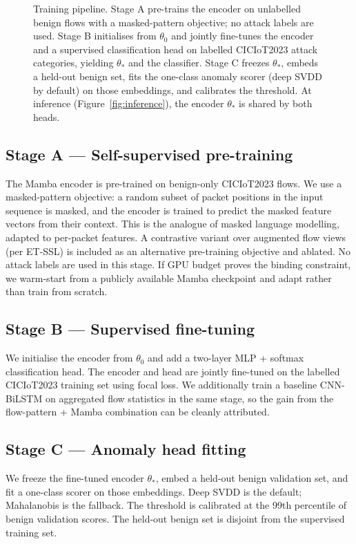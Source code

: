 \documentclass[11pt,a4paper]{article}
\begin{document}
\begin{figure}[H]
\begin{tikzpicture}[node distance=0.55cm and 0.7cm]
\end{tikzpicture}
\caption{Training pipeline. Stage A pre-trains the encoder on unlabelled benign flows with a masked-pattern objective; no attack labels are used. Stage B initialises from $\theta_0$ and jointly fine-tunes the encoder and a supervised classification head on labelled CICIoT2023 attack categories, yielding $\theta_*$ and the classifier. Stage C freezes $\theta_*$, embeds a held-out benign set, fits the one-class anomaly scorer (deep SVDD by default) on those embeddings, and calibrates the threshold. At inference (Figure~\ref{fig:inference}), the encoder $\theta_*$ is shared by both heads.}
\label{fig:training}
\end{figure}

\subsection{Stage A --- Self-supervised pre-training}
The Mamba encoder is pre-trained on benign-only CICIoT2023 flows. We use a masked-pattern objective: a random subset of packet positions in the input sequence is masked, and the encoder is trained to predict the masked feature vectors from their context. This is the analogue of masked language modelling, adapted to per-packet features. A contrastive variant over augmented flow views (per ET-SSL) is included as an alternative pre-training objective and ablated. No attack labels are used in this stage. If GPU budget proves the binding constraint, we warm-start from a publicly available Mamba checkpoint and adapt rather than train from scratch.

\subsection{Stage B --- Supervised fine-tuning}
We initialise the encoder from $\theta_0$ and add a two-layer MLP + softmax classification head. The encoder and head are jointly fine-tuned on the labelled CICIoT2023 training set using focal loss. We additionally train a baseline CNN-BiLSTM on aggregated flow statistics in the same stage, so the gain from the flow-pattern + Mamba combination can be cleanly attributed.

\subsection{Stage C --- Anomaly head fitting}
We freeze the fine-tuned encoder $\theta_*$, embed a held-out benign validation set, and fit a one-class scorer on those embeddings. Deep SVDD is the default; Mahalanobis is the fallback. The threshold is calibrated at the 99th percentile of benign validation scores. The held-out benign set is disjoint from the supervised training set.
\end{document}
